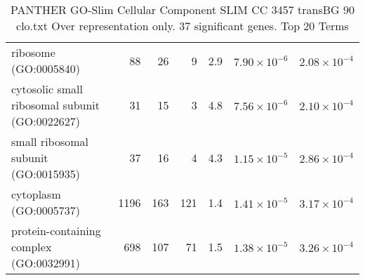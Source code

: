 \begin{table}[ht]
\begin{adjustbox}{width=\textwidth}
\begin{tabular}{lrrrrrr}
  ribosome (GO:0005840) & 88 & 26 & 9 & 2.9 & $7.90 \times 10^{-6}$ & $2.08 \times 10^{-4}$ \\ 
  cytosolic small ribosomal subunit (GO:0022627) & 31 & 15 & 3 & 4.8 & $7.56 \times 10^{-6}$ & $2.10 \times 10^{-4}$ \\ 
  small ribosomal subunit (GO:0015935) & 37 & 16 & 4 & 4.3 & $1.15 \times 10^{-5}$ & $2.86 \times 10^{-4}$ \\ 
  cytoplasm (GO:0005737) & 1196 & 163 & 121 & 1.4 & $1.41 \times 10^{-5}$ & $3.17 \times 10^{-4}$ \\ 
  protein-containing complex (GO:0032991) & 698 & 107 & 71 & 1.5 & $1.38 \times 10^{-5}$ & $3.26 \times 10^{-4}$ \\ 
   \hline
\end{tabular}
\end{adjustbox}
\caption{PANTHER GO-Slim Cellular Component SLIM CC 3457 transBG 90 clo.txt Over representation only. 37 significant genes. Top 20 Terms} 
\label{tab:PANTHER GO-Slim Cellular Component SLIM CC 3457 transBG 90 clo.txt Over representation only. 37 significant genes. Top 20 Terms}
\end{table}



